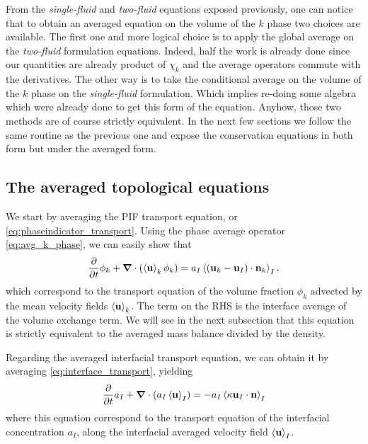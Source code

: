 From the \textit{single-fluid} and \textit{two-fluid} equations exposed previously, one can  notice that to obtain an averaged equation on the volume of the $k$ phase two choices are available. 
The first one and more logical choice is to apply the global average on the \textit{two-fluid} formulation equations.
Indeed, half the work is already done since our quantities are already product of $\chi_k$ and the average operators commute with the derivatives.
The other way is to take the conditional average on the volume of the $k$ phase on the \textit{single-fluid} formulation. 
Which implies re-doing some algebra which were already done to get this form of the 
equation.
Anyhow, those two methods are of course strictly equivalent.
In the next few sections we follow the same routine as the previous one and expose the conservation equations in both form but under the averaged form. 


\subsection{The averaged topological equations}

We start by averaging the PIF transport equation, or \ref{eq:phaseindicator_transport}. 
Using the phase average operator \ref{eq:avg_k_phase}, we can easily show that
\begin{equation}
    \frac{\partial}{\partial t} \phi_k 
    + \bm{\nabla} \cdot \left(
        \left<\textbf{u}\right>_k\phi_k 
    \right) 
    = a_I\left<(\textbf{u}_k-\textbf{u}_I) \cdot \textbf{n}_k\right>_I, 
\end{equation}
which correspond to the transport equation of the volume fraction $\phi_k$ advected by the mean velocity fields $\left<\textbf{u}\right>_k$.
The term on the RHS is the interface average of the volume exchange term. 
We will see in the next subsection that this equation is strictly equivalent to the averaged mass balance divided by the density.

Regarding the averaged interfacial transport equation, we can obtain it by averaging \ref{eq:interface_transport}, yielding
\begin{equation}
    \frac{\partial}{\partial t} a_I
    + \bm{\nabla} \cdot \left(
        a_I
        \left<\textbf{u}\right>_I
    \right)
    = - a_I \left<\kappa \textbf{u}_I \cdot \textbf{n}\right>_I
    \label{eq:avg_I_a}
\end{equation}
where this equation correspond to the transport equation of the interfacial concentration $a_I$, along the interfacial averaged velocity field $\left<\textbf{u}\right>_I$.

